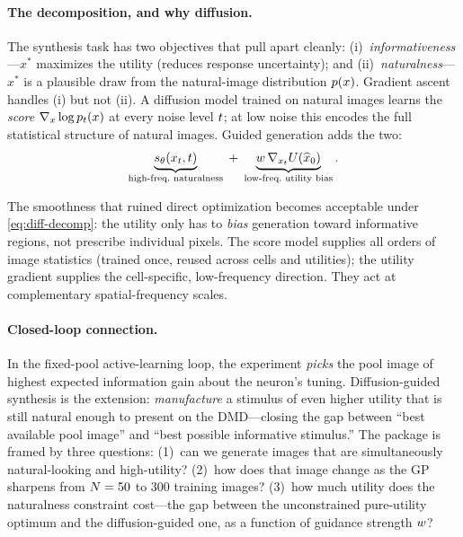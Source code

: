 \paragraph{The decomposition, and why diffusion.}
The synthesis task has two objectives that pull apart cleanly:
(i)~\emph{informativeness}---$x^{*}$ maximizes the utility (reduces response
uncertainty); and (ii)~\emph{naturalness}---$x^{*}$ is a plausible draw from the
natural-image distribution $p(x)$. Gradient ascent handles (i) but not (ii). A
diffusion model trained on natural images learns the \emph{score}
$\nabla_{x}\log p_{t}(x)$ at every noise level $t$; at low noise this encodes
the full statistical structure of natural images. Guided generation adds the two:
\begin{equation}
\underbrace{\score(\xt,\dt)}_{\text{high-freq.\ naturalness}}
\;+\;
\underbrace{\gw\,\nabla_{\xt}U(\xhat)}_{\text{low-freq.\ utility bias}} .
\label{eq:diff-decomp}
\end{equation}

\begin{remark}
The smoothness that ruined direct optimization becomes acceptable under
\eqref{eq:diff-decomp}: the utility only has to \emph{bias} generation toward
informative regions, not prescribe individual pixels. The score model supplies
all orders of image statistics (trained once, reused across cells and utilities);
the utility gradient supplies the cell-specific, low-frequency direction. They act
at complementary spatial-frequency scales.
\end{remark}

\paragraph{Closed-loop connection.}
In the fixed-pool active-learning loop, the experiment \emph{picks} the pool image
of highest expected information gain about the neuron's tuning. Diffusion-guided
synthesis is the extension: \emph{manufacture} a stimulus of even higher utility
that is still natural enough to present on the DMD---closing the gap between
``best available pool image'' and ``best possible informative stimulus.'' The
package is framed by three questions: (1)~can we generate images that are
simultaneously natural-looking and high-utility?  (2)~how does that image change
as the GP sharpens from $N=50$ to $300$ training images?  (3)~how much utility
does the naturalness constraint cost---the gap between the unconstrained
pure-utility optimum and the diffusion-guided one, as a function of guidance
strength $w$?

